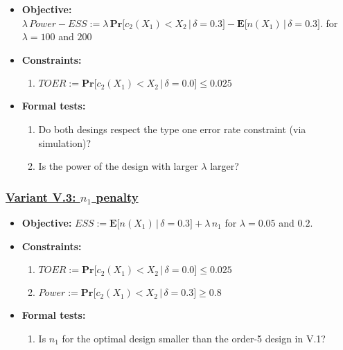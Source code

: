 \documentclass[]{book}
\providecommand{\tightlist}{%
  \setlength{\itemsep}{0pt}\setlength{\parskip}{0pt}}
\begin{document}
\begin{itemize}
\tightlist
\item
  \textbf{Objective:} \(\lambda\, Power - ESS := \lambda\, \boldsymbol{Pr}\big[c_2(X_1) < X_2\,|\,\delta=0.3\big] - \boldsymbol{E}\big[n(X_1)\,|\,\delta=0.3\big].\)
  for \(\lambda = 100\) and \(200\)
\item
  \textbf{Constraints:}

  \begin{enumerate}
  \def\labelenumi{\arabic{enumi}.}
  \tightlist
  \item
    \(TOER := \boldsymbol{Pr}\big[c_2(X_1) < X_2\,|\,\delta=0.0\big] \leq 0.025\)
  \end{enumerate}
\item
  \textbf{Formal tests:}

  \begin{enumerate}
  \def\labelenumi{\arabic{enumi}.}
  \tightlist
  \item
    Do both desings respect the type one error rate constraint (via simulation)?
  \item
    Is the power of the design with larger \(\lambda\) larger?
  \end{enumerate}
\end{itemize}

\hypertarget{variant-v.3-n_1-penalty}{%
\subsubsection{\texorpdfstring{\protect\hyperlink{variantV_3}{Variant V.3: \(n_1\) penalty}}{Variant V.3: n\_1 penalty}}\label{variant-v.3-n_1-penalty}}

\begin{itemize}
\tightlist
\item
  \textbf{Objective:} \(ESS := \boldsymbol{E}\big[n(X_1)\,|\,\delta=0.3\big] + \lambda \, n_1\)
  for \(\lambda = 0.05\) and \(0.2\).
\item
  \textbf{Constraints:}

  \begin{enumerate}
  \def\labelenumi{\arabic{enumi}.}
  \tightlist
  \item
    \(TOER := \boldsymbol{Pr}\big[c_2(X_1) < X_2\,|\,\delta=0.0\big] \leq 0.025\)
  \item
    \(Power := \boldsymbol{Pr}\big[c_2(X_1) < X_2\,|\,\delta=0.3\big] \geq 0.8\)
  \end{enumerate}
\item
  \textbf{Formal tests:}

  \begin{enumerate}
  \def\labelenumi{\arabic{enumi}.}
  \tightlist
  \item
    Is \(n_1\) for the optimal design smaller than the order-5 design in V.1?
  \end{enumerate}
\end{itemize}
\end{document}
